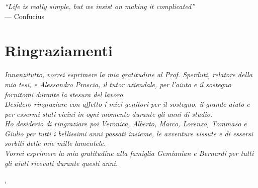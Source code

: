 
\cleardoublepage
{}
{}
\begin{flushright}{
	\slshape
	``Life is really simple, but we insist on making it complicated''} \\
	\medskip
    --- Confucius
\end{flushright}


\bigskip

\begingroup
\let\clearpage\relax
\let\cleardoublepage\relax
\let\cleardoublepage\relax

\chapter*{Ringraziamenti}

\noindent \textit{Innanzitutto, vorrei esprimere la mia gratitudine al Prof. Sperduti, relatore della mia tesi, e Alessandro Proscia, il tutor aziendale, per l'aiuto e il sostegno fornitomi durante la stesura del lavoro.}\\

\noindent \textit{Desidero ringraziare con affetto i miei genitori per il sostegno, il grande aiuto e per essermi stati vicini in ogni momento durante gli anni di studio.}\\

\noindent \textit{Ho desiderio di ringraziare poi Veronica, Alberto, Marco, Lorenzo, Tommaso e Giulio per tutti i bellissimi anni passati insieme, le avventure vissute e di essersi sorbiti delle mie mille lamentele.}\\

\noindent \textit{Vorrei esprimere la mia gratitudine alla famiglia Gemianian e Bernardi per tutti gli aiuti ricevuti durante questi anni.}\\
\bigskip

\noindent\textit{\myLocation, \myTime}
\hfill \myName

\endgroup

